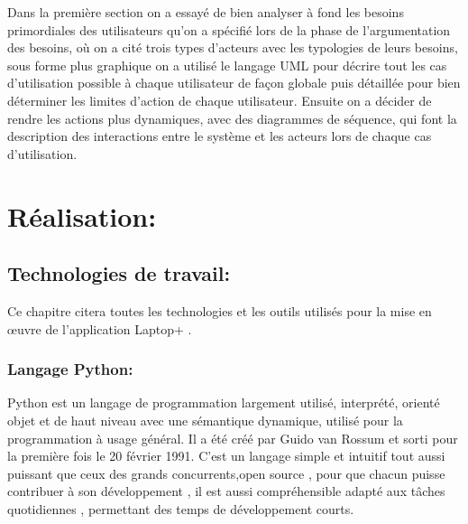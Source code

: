 \documentclass[a4paper]{report}
\begin{document}
\begin{doublespace}
\begin{doublespace}
\begin{doublespace}
\begin{doublespace}
\begin{doublespace}
                    Dans la première section on a essayé de bien analyser à fond les besoins primordiales des utilisateurs qu'on a spécifié lors de la phase de l'argumentation des besoins, où on a cité trois types d'acteurs avec les typologies de leurs besoins, sous forme plus graphique on a utilisé le langage UML pour décrire tout les cas d'utilisation possible à chaque utilisateur de façon globale puis  détaillée pour bien déterminer les limites d'action de chaque utilisateur.
                    Ensuite on a décider de rendre les actions plus dynamiques, avec des diagrammes de séquence, qui font la description des interactions entre le système et les acteurs lors de chaque cas d'utilisation.





                    \chapter{Réalisation:}
                    \fancyhead[L]{\hspace*{5cm}}
                    \begin{doublespace}

                        \section{Technologies de travail:}
                        Ce chapitre citera toutes les technologies et les outils utilisés pour la mise en œuvre de l'application Laptop+ .
                        \subsection{Langage Python:}
                        \begin{figure}[H]
                            \raggedleft{
                            }
                        \end{figure}
                        Python est un langage de programmation largement utilisé, interprété, orienté objet et de haut niveau avec une sémantique dynamique, utilisé pour la programmation à usage général. Il a été créé par Guido van Rossum et sorti pour la première fois le 20 février 1991. C'est un langage simple et intuitif tout aussi puissant que ceux des grands concurrents,open source , pour que chacun puisse contribuer à son développement , il est aussi compréhensible
                        adapté aux tâches quotidiennes , permettant des temps de développement courts.


\end{doublespace}
\end{doublespace}
\end{doublespace}
\end{doublespace}
\end{doublespace}
\end{doublespace}
\end{document}
